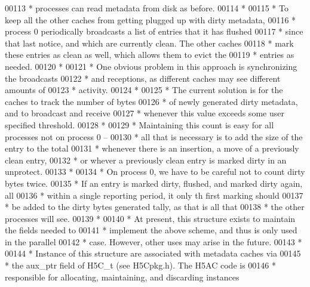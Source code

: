 \begin{DoxyCode}
00113 \textcolor{comment}{ * processes can read metadata from disk as before.}
00114 \textcolor{comment}{ *}
00115 \textcolor{comment}{ * To keep all the other caches from getting plugged up with dirty metadata,}
00116 \textcolor{comment}{ * process 0 periodically broadcasts a list of entries that it has flushed}
00117 \textcolor{comment}{ * since that last notice, and which are currently clean.  The other caches}
00118 \textcolor{comment}{ * mark these entries as clean as well, which allows them to evict the}
00119 \textcolor{comment}{ * entries as needed.}
00120 \textcolor{comment}{ *}
00121 \textcolor{comment}{ * One obvious problem in this approach is synchronizing the broadcasts}
00122 \textcolor{comment}{ * and receptions, as different caches may see different amounts of}
00123 \textcolor{comment}{ * activity.}
00124 \textcolor{comment}{ *}
00125 \textcolor{comment}{ * The current solution is for the caches to track the number of bytes}
00126 \textcolor{comment}{ * of newly generated dirty metadata, and to broadcast and receive}
00127 \textcolor{comment}{ * whenever this value exceeds some user specified threshold.}
00128 \textcolor{comment}{ *}
00129 \textcolor{comment}{ * Maintaining this count is easy for all processes not on process 0 --}
00130 \textcolor{comment}{ * all that is necessary is to add the size of the entry to the total}
00131 \textcolor{comment}{ * whenever there is an insertion, a move of a previously clean entry,}
00132 \textcolor{comment}{ * or whever a previously clean entry is marked dirty in an unprotect.}
00133 \textcolor{comment}{ *}
00134 \textcolor{comment}{ * On process 0, we have to be careful not to count dirty bytes twice.}
00135 \textcolor{comment}{ * If an entry is marked dirty, flushed, and marked dirty again, all}
00136 \textcolor{comment}{ * within a single reporting period, it only th first marking should}
00137 \textcolor{comment}{ * be added to the dirty bytes generated tally, as that is all that}
00138 \textcolor{comment}{ * the other processes will see.}
00139 \textcolor{comment}{ *}
00140 \textcolor{comment}{ * At present, this structure exists to maintain the fields needed to}
00141 \textcolor{comment}{ * implement the above scheme, and thus is only used in the parallel}
00142 \textcolor{comment}{ * case.  However, other uses may arise in the future.}
00143 \textcolor{comment}{ *}
00144 \textcolor{comment}{ * Instance of this structure are associated with metadata caches via}
00145 \textcolor{comment}{ * the aux\_ptr field of H5C\_t (see H5Cpkg.h).  The H5AC code is}
00146 \textcolor{comment}{ * responsible for allocating, maintaining, and discarding instances}

\end{DoxyCode}
